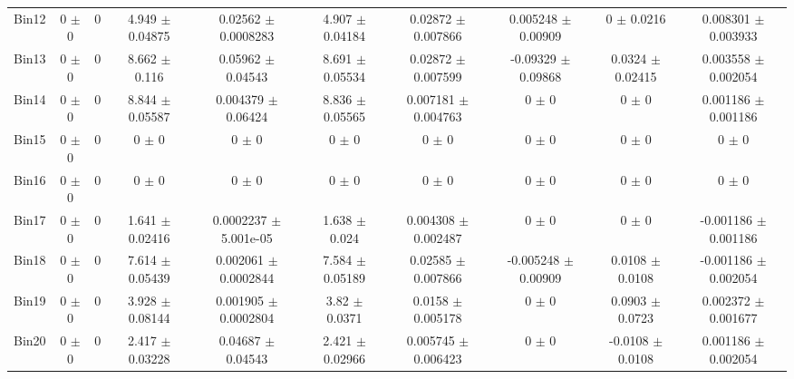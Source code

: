\begin{tabular}{@{\extracolsep{4pt}}lccccccccc@{}}
     Bin12 & 0 $\pm$ 0 & 0 & 4.949 $\pm$ 0.04875 & 0.02562 $\pm$ 0.0008283 & 4.907 $\pm$ 0.04184 & 0.02872 $\pm$ 0.007866 & 0.005248 $\pm$ 0.00909 & 0 $\pm$ 0.0216 & 0.008301 $\pm$ 0.003933 \\ 
     Bin13 & 0 $\pm$ 0 & 0 & 8.662 $\pm$ 0.116 & 0.05962 $\pm$ 0.04543 & 8.691 $\pm$ 0.05534 & 0.02872 $\pm$ 0.007599 & -0.09329 $\pm$ 0.09868 & 0.0324 $\pm$ 0.02415 & 0.003558 $\pm$ 0.002054 \\ 
     Bin14 & 0 $\pm$ 0 & 0 & 8.844 $\pm$ 0.05587 & 0.004379 $\pm$ 0.06424 & 8.836 $\pm$ 0.05565 & 0.007181 $\pm$ 0.004763 & 0 $\pm$ 0 & 0 $\pm$ 0 & 0.001186 $\pm$ 0.001186 \\ 
     Bin15 & 0 $\pm$ 0 & 0 & 0 $\pm$ 0 & 0 $\pm$ 0 & 0 $\pm$ 0 & 0 $\pm$ 0 & 0 $\pm$ 0 & 0 $\pm$ 0 & 0 $\pm$ 0 \\ 
     Bin16 & 0 $\pm$ 0 & 0 & 0 $\pm$ 0 & 0 $\pm$ 0 & 0 $\pm$ 0 & 0 $\pm$ 0 & 0 $\pm$ 0 & 0 $\pm$ 0 & 0 $\pm$ 0 \\ 
     Bin17 & 0 $\pm$ 0 & 0 & 1.641 $\pm$ 0.02416 & 0.0002237 $\pm$ 5.001e-05 & 1.638 $\pm$ 0.024 & 0.004308 $\pm$ 0.002487 & 0 $\pm$ 0 & 0 $\pm$ 0 & -0.001186 $\pm$ 0.001186 \\ 
     Bin18 & 0 $\pm$ 0 & 0 & 7.614 $\pm$ 0.05439 & 0.002061 $\pm$ 0.0002844 & 7.584 $\pm$ 0.05189 & 0.02585 $\pm$ 0.007866 & -0.005248 $\pm$ 0.00909 & 0.0108 $\pm$ 0.0108 & -0.001186 $\pm$ 0.002054 \\ 
     Bin19 & 0 $\pm$ 0 & 0 & 3.928 $\pm$ 0.08144 & 0.001905 $\pm$ 0.0002804 & 3.82 $\pm$ 0.0371 & 0.0158 $\pm$ 0.005178 & 0 $\pm$ 0 & 0.0903 $\pm$ 0.0723 & 0.002372 $\pm$ 0.001677 \\ 
     Bin20 & 0 $\pm$ 0 & 0 & 2.417 $\pm$ 0.03228 & 0.04687 $\pm$ 0.04543 & 2.421 $\pm$ 0.02966 & 0.005745 $\pm$ 0.006423 & 0 $\pm$ 0 & -0.0108 $\pm$ 0.0108 & 0.001186 $\pm$ 0.002054 \\ 
\hline\hline
  \end{tabular}
